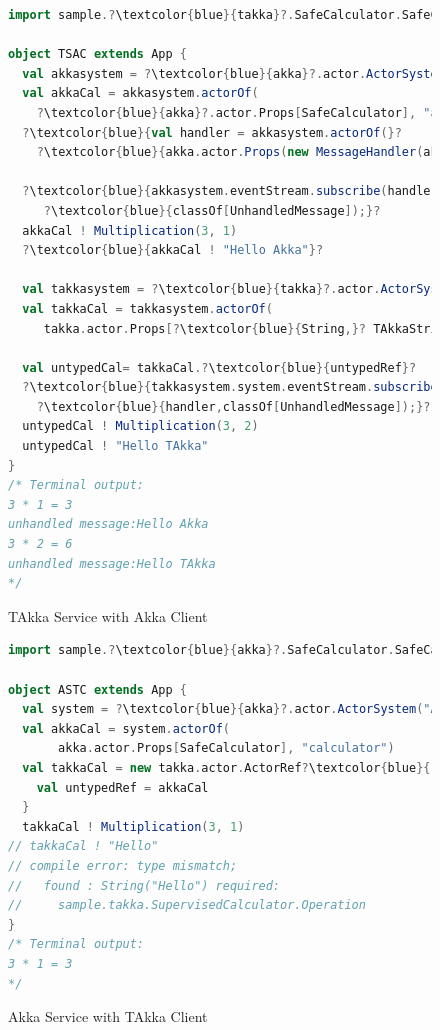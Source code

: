 \begin{figure}[t]

      \begin{lstlisting}[language=scala, escapechar=?]
import sample.?\textcolor{blue}{takka}?.SafeCalculator.SafeCalculator      
      
object TSAC extends App {
  val akkasystem = ?\textcolor{blue}{akka}?.actor.ActorSystem("AkkaSystem")
  val akkaCal = akkasystem.actorOf(
    ?\textcolor{blue}{akka}?.actor.Props[SafeCalculator], "acal")
  ?\textcolor{blue}{val handler = akkasystem.actorOf(}?
    ?\textcolor{blue}{akka.actor.Props(new MessageHandler(akkasystem)))}?
  
  ?\textcolor{blue}{akkasystem.eventStream.subscribe(handler,}?
     ?\textcolor{blue}{classOf[UnhandledMessage]);}?
  akkaCal ! Multiplication(3, 1)     
  ?\textcolor{blue}{akkaCal ! "Hello Akka"}?
  
  val takkasystem = ?\textcolor{blue}{takka}?.actor.ActorSystem("TAkkaSystem")
  val takkaCal = takkasystem.actorOf(
     takka.actor.Props[?\textcolor{blue}{String,}? TAkkaStringActor], "tcal")
  
  val untypedCal= takkaCal.?\textcolor{blue}{untypedRef}?  
  ?\textcolor{blue}{takkasystem.system.eventStream.subscribe(}?
    ?\textcolor{blue}{handler,classOf[UnhandledMessage]);}?  
  untypedCal ! Multiplication(3, 2)     
  untypedCal ! "Hello TAkka"
}
/* Terminal output:
3 * 1 = 3
unhandled message:Hello Akka
3 * 2 = 6
unhandled message:Hello TAkka
*/
    \end{lstlisting}
    \caption{TAkka Service with Akka Client}
\label{takkaINakka}    
\vspace{-15pt }
\end{figure}



\begin{figure}[t]
      \begin{lstlisting}[language=scala, escapechar=?]
import sample.?\textcolor{blue}{akka}?.SafeCalculator.SafeCalculator   

object ASTC extends App {
  val system = ?\textcolor{blue}{akka}?.actor.ActorSystem("AkkaSystem")
  val akkaCal = system.actorOf(
       akka.actor.Props[SafeCalculator], "calculator")
  val takkaCal = new takka.actor.ActorRef?\textcolor{blue}{[Operation]}?{
    val untypedRef = akkaCal
  }
  takkaCal ! Multiplication(3, 1)
// takkaCal ! "Hello" 
// compile error: type mismatch; 
//   found : String("Hello") required: 
//     sample.takka.SupervisedCalculator.Operation
}
/* Terminal output:
3 * 1 = 3
*/
    \end{lstlisting}
    \caption{Akka Service with TAkka Client}
\label{akkaINtakka}    
\vspace{-15pt }
\end{figure}

